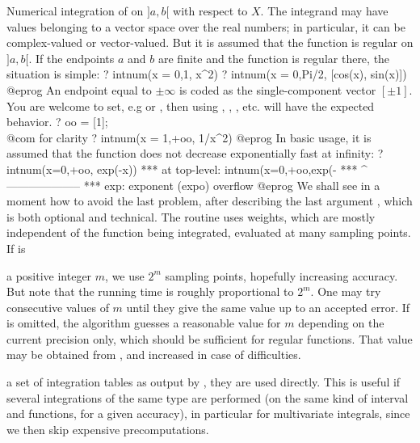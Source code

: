 \label{se:intnum}
Numerical integration
of  on $]a,b[$ with respect to $X$. The integrand may have values
belonging to a vector space over the real numbers; in particular, it can be
complex-valued or vector-valued. But it is assumed that the function is regular
on $]a,b[$. If the endpoints $a$ and $b$ are finite and the function is regular
there, the situation is simple:
\bprog
? intnum(x = 0,1, x^2)
? intnum(x = 0,Pi/2, [cos(x), sin(x)])
@eprog\noindent
An endpoint equal to $\pm\infty$ is coded as the single-component vector
$[\pm1]$. You are welcome to set, e.g  or ,
then using , , , etc. will have the expected
behavior.
\bprog
? oo = [1];  \\@com for clarity
? intnum(x = 1,+oo, 1/x^2)
@eprog\noindent
In basic usage, it is assumed that the function does not decrease
exponentially fast at infinity:
\bprog
? intnum(x=0,+oo, exp(-x))
  ***   at top-level: intnum(x=0,+oo,exp(-
  ***                 ^--------------------
  *** exp: exponent (expo) overflow
@eprog\noindent
We shall see in a moment how to avoid the last problem, after describing
the last argument , which is both optional and technical. The
routine uses weights, which are mostly independent of the function being
integrated, evaluated at many sampling points. If  is

\item a positive integer $m$, we use $2^m$ sampling points, hopefully
increasing accuracy. But note that the running time is roughly proportional
to $2^m$. One may try consecutive values of $m$ until they give the same
value up to an accepted error. If  is omitted, the algorithm guesses
a reasonable value for $m$ depending on the current precision only, which
should be sufficient for regular functions. That value may be obtained from
, and increased in case of difficulties.

\item a set of integration tables as output by ,
they are used directly. This is useful if several integrations of the same
type are performed (on the same kind of interval and functions, for a given
accuracy), in particular for multivariate integrals, since we then skip
expensive precomputations.

